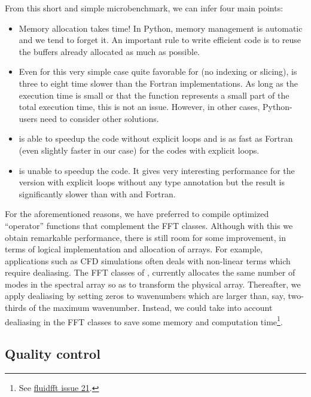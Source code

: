 From this short and simple microbenchmark, we can infer four main points:
\begin{itemize}
\item Memory allocation takes time!  In Python, memory management is automatic
and we tend to forget it.  An important rule to write efficient code is to
reuse the buffers already allocated as much as possible.

\item Even for this very simple case quite favorable for  (no indexing
or slicing),  is three to eight time slower than the Fortran
implementations. As long as the execution time is small or that the
function represents a small part of the total execution time, this is not an
issue. However, in other cases, Python- users need to consider
other solutions.

\item {} is able to speedup the  code without explicit
loops and is as fast as Fortran (even slightly faster in our case) for the
codes with explicit loops.

\item {} is unable to speedup the  code.
%
It gives very interesting performance for the version with explicit loops
without any type annotation but the result is significantly slower than with
 and Fortran.
\end{itemize}

For the aforementioned reasons, we have preferred  to compile
optimized ``operator'' functions that complement the FFT classes. Although with
this we obtain remarkable performance, there is still room for some
improvement, in terms of logical implementation and allocation of arrays. For
example, applications such as CFD simulations often deals with non-linear terms
which require dealiasing. The FFT classes of , currently
allocates the same number of modes in the spectral array so as to transform the
physical array. Thereafter, we apply dealiasing by setting zeros to wavenumbers
which are larger than, say, two-thirds of the maximum wavenumber. Instead, we
could take into account dealiasing in the FFT classes to save some memory and
computation time\footnote{See
\href{https://bitbucket.org/fluiddyn/fluidfft/issues/21/}{fluidfft issue 21}.}.

\subsection{Quality control}

